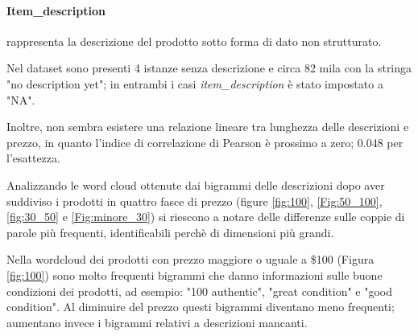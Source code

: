 \paragraph{Item\_description} rappresenta la descrizione del prodotto sotto forma
di dato non strutturato.

Nel dataset sono presenti 4 istanze senza descrizione e
circa 82 mila con la stringa "no description yet"; in entrambi i casi
\textit{item\_description} è stato impostato a "NA".

Inoltre, non sembra esistere una relazione lineare tra lunghezza delle
descrizioni e prezzo, in quanto l'indice di correlazione di Pearson è prossimo a
zero; 0.048 per l'esattezza.

Analizzando le word cloud ottenute dai bigrammi delle descrizioni dopo aver
suddiviso i prodotti in quattro fasce di prezzo (figure \ref{fig:100},
\ref{Fig:50_100}, \ref{fig:30_50} e \ref{Fig:minore_30}) si riescono a notare
delle differenze sulle coppie di parole più frequenti, identificabili perchè di
dimensioni più grandi.

Nella wordcloud dei prodotti con prezzo maggiore o uguale a \$100 (Figura
\ref{fig:100}) sono molto frequenti bigrammi che danno informazioni sulle buone
condizioni dei prodotti, ad esempio: "100 authentic", "great condition" e "good
condition". Al diminuire del prezzo questi bigrammi diventano meno frequenti;
aumentano invece i bigrammi relativi a descrizioni mancanti.

